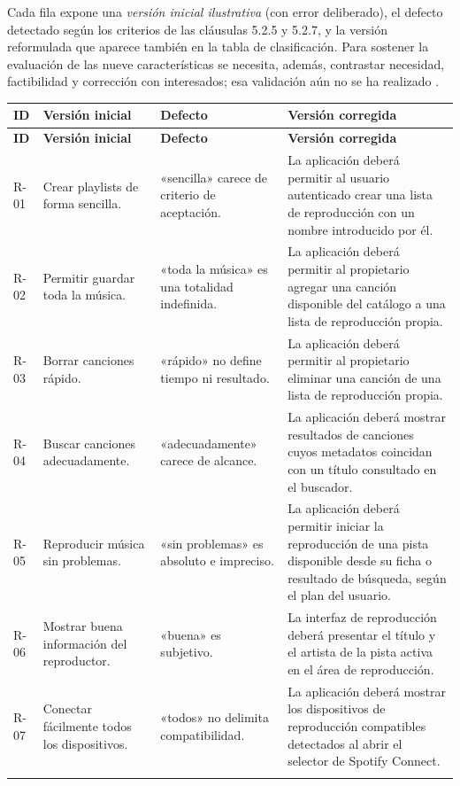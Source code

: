 Cada fila expone una \emph{versión inicial ilustrativa} (con error deliberado), el defecto detectado según los criterios de las cláusulas 5.2.5 y 5.2.7, y la versión reformulada que aparece también en la tabla de clasificación. Para sostener la evaluación de las nueve características se necesita, además, contrastar necesidad, factibilidad y corrección con interesados; esa validación aún no se ha realizado \cite{iso29148}.
\begingroup\scriptsize\renewcommand{\arraystretch}{1.09}
\begin{longtable}{@{}p{.06\linewidth}p{.185\linewidth}p{.19\linewidth}p{.51\linewidth}@{}}\toprule
\textbf{ID}&\textbf{Versión inicial}&\textbf{Defecto}&\textbf{Versión corregida}\\\midrule\endfirsthead
\toprule\textbf{ID}&\textbf{Versión inicial}&\textbf{Defecto}&\textbf{Versión corregida}\\\midrule\endhead
R-01 & Crear playlists de forma sencilla. & «sencilla» carece de criterio de aceptación. & La aplicación deberá permitir al usuario autenticado crear una lista de reproducción con un nombre introducido por él.\\\addlinespace[0pt]
R-02 & Permitir guardar toda la música. & «toda la música» es una totalidad indefinida. & La aplicación deberá permitir al propietario agregar una canción disponible del catálogo a una lista de reproducción propia.\\\addlinespace[0pt]
R-03 & Borrar canciones rápido. & «rápido» no define tiempo ni resultado. & La aplicación deberá permitir al propietario eliminar una canción de una lista de reproducción propia.\\\addlinespace[0pt]
R-04 & Buscar canciones adecuadamente. & «adecuadamente» carece de alcance. & La aplicación deberá mostrar resultados de canciones cuyos metadatos coincidan con un título consultado en el buscador.\\\addlinespace[0pt]
R-05 & Reproducir música sin problemas. & «sin problemas» es absoluto e impreciso. & La aplicación deberá permitir iniciar la reproducción de una pista disponible desde su ficha o resultado de búsqueda, según el plan del usuario.\\\addlinespace[0pt]
R-06 & Mostrar buena información del reproductor. & «buena» es subjetivo. & La interfaz de reproducción deberá presentar el título y el artista de la pista activa en el área de reproducción.\\\addlinespace[0pt]
R-07 & Conectar fácilmente todos los dispositivos. & «todos» no delimita compatibilidad. & La aplicación deberá mostrar los dispositivos de reproducción compatibles detectados al abrir el selector de Spotify Connect.\\\addlinespace[0pt]

\end{longtable}
